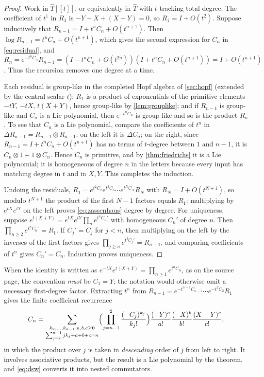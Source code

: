\begin{proof}
Work in $\widehat T[[t]]$, or equivalently in $\widehat T$ with $t$ tracking
total degree. The coefficient of $t^1$ in $R_1$ is $-Y-X+(X+Y)=0$, so
$R_1=I+O(t^2)$. Suppose inductively that $R_{n-1}=I+t^nC_n+O(t^{n+1})$.
Then $\log R_{n-1}=t^nC_n+O(t^{n+1})$, which gives the second expression
for $C_n$ in \eqref{eq:residual}, and
$R_n=e^{-t^nC_n}R_{n-1}=(I-t^nC_n+O(t^{2n}))(I+t^nC_n+O(t^{n+1}))
=I+O(t^{n+1})$. Thus the recursion removes one degree at a time.

Each residual is group-like in the completed Hopf algebra of
\cref{sec:hopf} (extended by the central scalar $t$): $R_1$ is a product of
exponentials of the primitive elements $-tY$, $-tX$, $t(X+Y)$, hence
group-like by \cref{lem:grouplike}; and if $R_{n-1}$ is group-like and
$C_n$ is a Lie polynomial, then $e^{-t^nC_n}$ is group-like and so is the
product $R_n$. To see that $C_n$ is a Lie polynomial, compare the
coefficients of $t^n$ in $\Delta R_{n-1}=R_{n-1}\otimes R_{n-1}$: on the
left it is $\Delta C_n$; on the right, since
$R_{n-1}=I+t^nC_n+O(t^{n+1})$ has no terms of $t$-degree between $1$ and
$n-1$, it is $C_n\otimes1+1\otimes C_n$. Hence $C_n$ is primitive, and by
\cref{thm:friedrichs} it is a Lie polynomial; it is homogeneous of degree
$n$ in the letters because every input has matching degree in $t$ and in
$X,Y$. This completes the induction.

Undoing the residuals, $R_1=e^{t^2C_2}e^{t^3C_3}\cdots e^{t^NC_N}R_N$ with
$R_N=I+O(t^{N+1})$, so modulo $t^{N+1}$ the product of the first $N-1$
factors equals $R_1$; multiplying by $e^{tX}e^{tY}$ on the left proves
\eqref{eq:zassenhaus} degree by degree. For uniqueness, suppose
$e^{t(X+Y)}=e^{tX}e^{tY}\prod_ne^{t^nC_n'}$ with homogeneous $C_n'$ of
degree $n$. Then $\prod_{n\geq2}e^{t^nC_n'}=R_1$. If $C_j'=C_j$ for
$j<n$, then multiplying on the left by the inverses of the first factors
gives $\prod_{j\geq n}e^{t^jC_j'}=R_{n-1}$, and comparing coefficients of
$t^n$ gives $C_n'=C_n$. Induction proves uniqueness.
\end{proof}
When the identity is written as $e^{-tX}e^{t(X+Y)}=\prod_{n\geq1}e^{t^nC_n}$,
as on the source page, the convention \emph{must} be $C_1=Y$; the notation
would otherwise omit a necessary first-degree factor. Extracting $t^n$
from $R_{n-1}=e^{-t^{n-1}C_{n-1}}\cdots e^{-t^2C_2}R_1$ gives the finite
coefficient recurrence
\begin{equation}\label{eq:zassfinitecoeff}
 C_n=\sum_{\substack{k_2,\ldots,k_{n-1},a,b,c\geq0\\
                 \sum_{j=2}^{n-1}jk_j+a+b+c=n}}
 \Bigl(\prod_{j=n-1}^{2}\frac{(-C_j)^{k_j}}{k_j!}\Bigr)
 \frac{(-Y)^a}{a!}\frac{(-X)^b}{b!}\frac{(X+Y)^c}{c!},
\end{equation}
in which the product over $j$ is taken in \emph{descending} order of $j$
from left to right. It involves associative products, but the result is a
Lie polynomial by the theorem, and \eqref{eq:dsw} converts it into nested
commutators.

